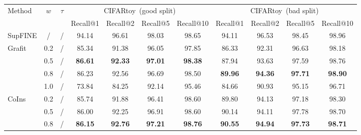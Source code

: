 \documentclass[10pt,twocolumn,letterpaper]{article}
\begin{document}
\begin{table*}[htbp]
\centering
\begin{tabular}{@{}l|c|c|cccc|cccc@{}}
\toprule
\multirow{2}{*}{Method}  & \multirow{2}{*}{$w$} & \multirow{2}{*}{$\tau$} & \multicolumn{4}{c|}{CIFARtoy~(good split)}                        & \multicolumn{4}{c}{CIFARtoy~(bad split)}                          \\ \cmidrule(l){4-11} 
                         &                      &                         & Recall@1       & Recall@2       & Recall@5       & Recall@10      & Recall@1       & Recall@2       & Recall@5       & Recall@10      \\ \midrule
SupFINE                  & /                    & /                       & 94.14          & 96.61          & 98.03          & 98.65          & 94.11          & 96.53          & 98.45          & 98.96          \\ \midrule
\multirow{4}{*}{Grafit}  & 0.2                  & /                       & 85.34          & 91.38          & 96.05          & 97.85          & 86.33          & 92.31          & 96.63          & 98.18          \\
                         & 0.5                  & /                       & \textbf{86.61} & \textbf{92.33} & \textbf{97.01} & \textbf{98.38} & 87.94          & 93.63          & 97.59          & 98.76          \\
                         & 0.8                  & /                       & 86.23          & 92.56          & 96.69          & 98.50          & \textbf{89.96} & \textbf{94.36} & \textbf{97.71} & \textbf{98.90} \\
                         & 1.0                  & /                       & 73.84          & 84.25          & 92.14          & 95.46          & 84.66          & 90.93          & 95.15          & 96.71          \\ \midrule
\multirow{4}{*}{CoIns}   & 0.2                  & /                       & 85.74          & 91.88          & 96.41          & 98.60          & 89.80          & 94.13          & 97.18          & 98.30          \\
                         & 0.5                  & /                       & 86.00          & 92.25          & 96.91          & 98.60          & 90.14          & 94.11          & 97.78          & 98.70          \\
                         & 0.8                  & /                       & \textbf{86.15} & \textbf{92.76} & \textbf{97.21} & \textbf{98.76} & \textbf{90.55} & \textbf{94.94} & \textbf{97.73} & \textbf{98.71} \\

\end{tabular}
\end{table*}
\end{document}
